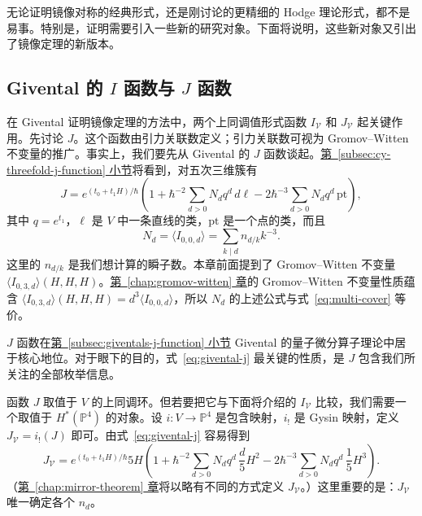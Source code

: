 无论证明镜像对称的经典形式，还是刚讨论的更精细的 Hodge 理论形式，都不是易事。特别是，证明需要引入一些新的研究对象。下面将说明，这些新对象又引出了镜像定理的新版本。

\subsection{Givental 的 $I$ 函数与 $J$ 函数}\label{subsec:givental-ij}

在 Givental 证明镜像定理的方法中，两个上同调值形式函数 $I_{\mathcal V}$ 和 $J_{\mathcal V}$ 起关键作用。先讨论 $J$。这个函数由引力关联数定义；引力关联数可视为 Gromov--Witten 不变量的推广。事实上，我们要先从 Givental 的 $J$ 函数谈起。\hyperref[subsec:cy-threefold-j-function]{第~\ref*{subsec:cy-threefold-j-function} 小节}将看到，对五次三维簇有
\begin{equation}\label{eq:givental-j}
J=e^{(t_0+t_1H)/\hbar}
\left(1+\hbar^{-2}\sum_{d>0}N_dq^d\,d\ell
-2\hbar^{-3}\sum_{d>0}N_dq^d\,\mathrm{pt}\right),
\end{equation}
其中 $q=e^{t_1}$，$\ell$ 是 $V$ 中一条直线的类，$\mathrm{pt}$ 是一个点的类，而且
\begin{equation}\label{eq:nd-gw}
N_d=\langle I_{0,0,d}\rangle=\sum_{k\mid d}n_{d/k}k^{-3}.
\end{equation}
这里的 $n_{d/k}$ 是我们想计算的瞬子数。本章前面提到了 Gromov--Witten 不变量 $\langle I_{0,3,d}\rangle(H,H,H)$。\hyperref[chap:gromov-witten]{第~\ref*{chap:gromov-witten} 章}的 Gromov--Witten 不变量性质蕴含 $\langle I_{0,3,d}\rangle(H,H,H)=d^3\langle I_{0,0,d}\rangle$，所以 $N_d$ 的上述公式与式~\eqref{eq:multi-cover} 等价。

$J$ 函数在\hyperref[subsec:giventals-j-function]{第~\ref*{subsec:giventals-j-function} 小节} Givental 的量子微分算子理论中居于核心地位。对于眼下的目的，式~\eqref{eq:givental-j} 最关键的性质，是 $J$ 包含我们所关注的全部枚举信息。

函数 $J$ 取值于 $V$ 的上同调环。但若要把它与下面将介绍的 $I_{\mathcal V}$ 比较，我们需要一个取值于 $H^*(\mathbb P^4)$ 的对象。设 $i:V\to\mathbb P^4$ 是包含映射，$i_!$ 是 Gysin 映射，定义 $J_{\mathcal V}=i_!(J)$ 即可。由式~\eqref{eq:givental-j} 容易得到
\begin{equation}\label{eq:givental-jv}
J_{\mathcal V}=e^{(t_0+t_1H)/\hbar}5H
\left(1+\hbar^{-2}\sum_{d>0}N_dq^d\,\frac d5H^2
-2\hbar^{-3}\sum_{d>0}N_dq^d\,\frac15H^3\right).
\end{equation}
（\hyperref[chap:mirror-theorem]{第~\ref*{chap:mirror-theorem} 章}将以略有不同的方式定义 $J_{\mathcal V}$。）这里重要的是：$J_{\mathcal V}$ 唯一确定各个 $n_d$。


